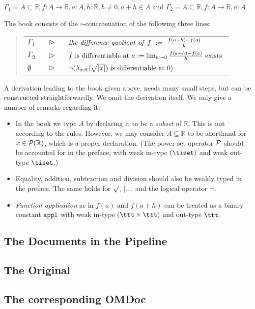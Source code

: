 \documentclass{report}
\def\omdoc{OMDoc}
\begin{document}
$\Gamma_1 = A \subseteq \mathbb{R}, f : A \rightarrow \mathbb{R}, a : A,
h : \mathbb{R}, h \not = 0, a+h \in A $
and 
$\Gamma_2 = A \subseteq \mathbb{R}, f : A \rightarrow \mathbb{R}, a : A$ 

The book consists of the
$\circ$-concatenation of the following three lines:

\vspace{-0.08in}
\begin{quote} 
\begin{tabular}{l c l} 
$\Gamma_1$ & $~~\triangleright ~~$ & $ {\it the~difference~quotient~of~}f
~ := ~ \frac{f(a+h)-f(a)}{h}$ \\ $\Gamma_2$ & $~~\triangleright ~~$ & $ f
{\rm ~is~differentiable~at~}a := \lim_{h \rightarrow
0}\frac{f(a+h)-f(a)}{h} {\rm ~exists~}$ \\ $\emptyset$ & $ ~~
\triangleright ~~$ & $ \neg (\lambda_{x : \mathbb{R}}(\sqrt{|x|}) {\rm
~is~differentiable~at~}0)$
\end{tabular}
\end{quote} 
\vspace{-0.08in}
A derivation leading to the book given above, needs many
small steps, but can be constructed straightforwardly. We omit the
derivation itself. We only give a number of remarks regarding it:
\vspace{-0.08in}
\begin{itemize} 
\item In the  book we type $A$ by declaring it to be a
{\it subset\/} of $\mathbb{R}$. This is not according to the
rules. However, we may consider $A \subseteq \mathbb{R}$ to be
shorthand for $x \in {\cal P}(\mathbb{R})$, which is a proper
declaration. (The power set operator ${\cal P}$ should be accounted
for in the preface, with weak in-type $(\tiset)$ and weak out-type $\tiset$.)
\item Equality, addition, subtraction and division should also be
weakly typed in the preface. 
The same holds for $\raisebox{.5ex}{$\sqrt{}$}$, $|\ldots |$ and the 
logical operator $\neg$.
\item {\it Function application\/} as in $f(a)$ and $f(a+h)$ can be
treated as a binary constant ${\tt appl}$ with weak in-type $(\ttt \times
\ttt)$ and out-type $\ttt$.
\end{itemize} 

\begin{appendix}
\chapter{The Documents in the Pipeline}
\section{The Original}
  {\scriptsize{}}
\section{The corresponding {\omdoc}}
{\scriptsize{}}
\end{appendix}

\ednotemessage
\end{document}
